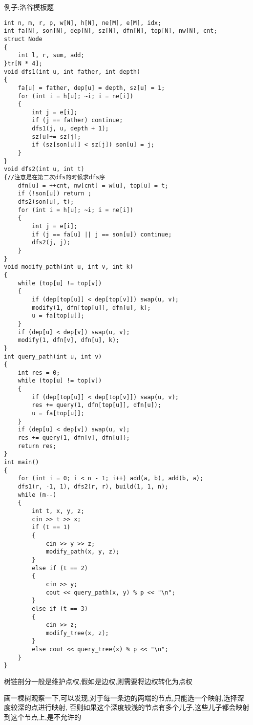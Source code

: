 \documentclass[a4paper,fontset=none]{ctexart}
\begin{document}
例子:洛谷模板题

\begin{verbatim}
int n, m, r, p, w[N], h[N], ne[M], e[M], idx;
int fa[N], son[N], dep[N], sz[N], dfn[N], top[N], nw[N], cnt;
struct Node
{
    int l, r, sum, add;
}tr[N * 4];
void dfs1(int u, int father, int depth)
{
    fa[u] = father, dep[u] = depth, sz[u] = 1;
    for (int i = h[u]; ~i; i = ne[i])
    {
        int j = e[i];
        if (j == father) continue;
        dfs1(j, u, depth + 1);
        sz[u]+= sz[j];
        if (sz[son[u]] < sz[j]) son[u] = j;
    }
}
void dfs2(int u, int t)
{//注意是在第二次dfs的时候求dfs序
    dfn[u] = ++cnt, nw[cnt] = w[u], top[u] = t;
    if (!son[u]) return ;
    dfs2(son[u], t);
    for (int i = h[u]; ~i; i = ne[i])
    {
        int j = e[i];
        if (j == fa[u] || j == son[u]) continue;
        dfs2(j, j);
    }
}
void modify_path(int u, int v, int k)
{
    while (top[u] != top[v])
    {
        if (dep[top[u]] < dep[top[v]]) swap(u, v);
        modify(1, dfn[top[u]], dfn[u], k);
        u = fa[top[u]];
    }
    if (dep[u] < dep[v]) swap(u, v);
    modify(1, dfn[v], dfn[u], k);
}
int query_path(int u, int v)
{
    int res = 0;
    while (top[u] != top[v])
    {
        if (dep[top[u]] < dep[top[v]]) swap(u, v);
        res += query(1, dfn[top[u]], dfn[u]);
        u = fa[top[u]];
    }
    if (dep[u] < dep[v]) swap(u, v);
    res += query(1, dfn[v], dfn[u]);
    return res;
}
int main()
{
    for (int i = 0; i < n - 1; i++) add(a, b), add(b, a);
    dfs1(r, -1, 1), dfs2(r, r), build(1, 1, n);
    while (m--)
    {
        int t, x, y, z;
        cin >> t >> x;
        if (t == 1)
        {
            cin >> y >> z;
            modify_path(x, y, z);
        }
        else if (t == 2)
        {
            cin >> y;
            cout << query_path(x, y) % p << "\n";
        }
        else if (t == 3)
        {
            cin >> z;
            modify_tree(x, z);
        }
        else cout << query_tree(x) % p << "\n";
    }
}
\end{verbatim}

树链剖分一般是维护点权,假如是边权,则需要将边权转化为点权

画一棵树观察一下,可以发现,对于每一条边的两端的节点,只能选一个映射,选择深度较深的点进行映射,
否则如果这个深度较浅的节点有多个儿子,这些儿子都会映射到这个节点上,是不允许的
\end{document}

